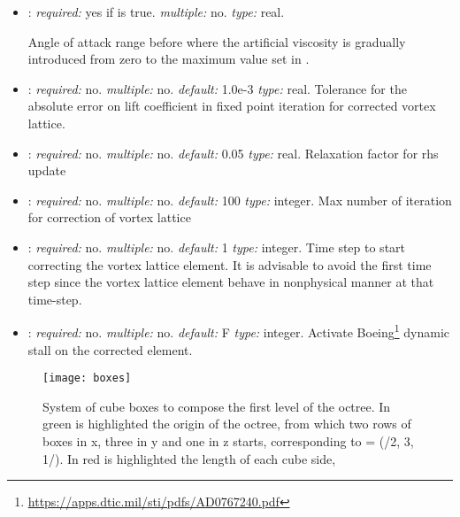 \begin{itemize}
\item {}: \textit{required:} yes if  is true. \textit{multiple:} no. \textit{type:} real.

Angle of attack range before  where the artificial viscosity is gradually introduced from zero to the maximum value set in .

\item {}: \textit{required:} no. \textit{multiple:} no. \textit{default:} 1.0e-3 \textit{type:} real. 
Tolerance for the absolute error on lift coefficient in fixed point iteration for corrected vortex lattice.

\item {}: \textit{required:} no. \textit{multiple:} no. \textit{default:} 0.05 \textit{type:} real. 
Relaxation factor for rhs update

\item {}: \textit{required:} no. \textit{multiple:} no. \textit{default:} 100 \textit{type:} integer. 
Max number of iteration for correction of vortex lattice

\item {}: \textit{required:} no. \textit{multiple:} no. \textit{default:} 1 \textit{type:} integer. 
Time step to start correcting the vortex lattice element. It is advisable to avoid the first time step since the vortex lattice element behave in nonphysical manner at that time-step. 

\item {}: \textit{required:} no. \textit{multiple:} no. \textit{default:} F \textit{type:} integer. 
Activate Boeing\footnote{\url{https://apps.dtic.mil/sti/pdfs/AD0767240.pdf}} dynamic stall on the corrected  element.   


\end{itemize}

\begin{figure}
\centering
\texttt{[image: boxes]}
\caption{System of cube boxes to compose the first level of the octree. In green is highlighted the origin of the octree, from which two rows of boxes in x, three in y and one in z starts, corresponding to  = (/2, 3, 1/). In red is highlighted the length of each cube side, }
\label{fig:boxes1}
\end{figure}




